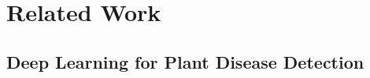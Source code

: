 %
\chapter{Related Work}
\label{chap:related}

\section{Deep Learning for Plant Disease Detection}
\label{sec:related-plant}
%

